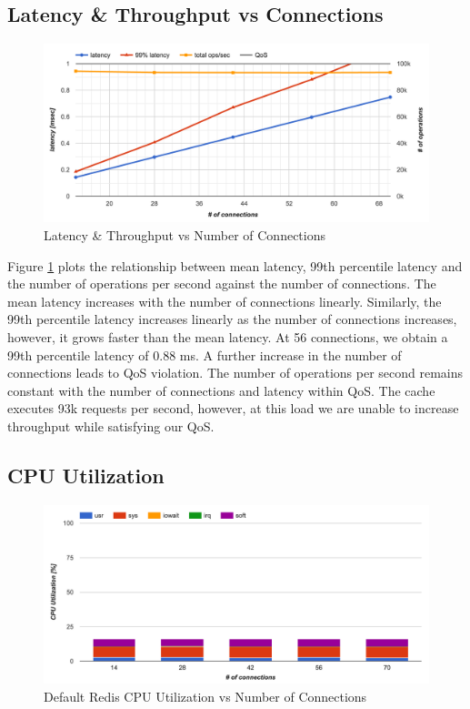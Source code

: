 \subsection{Latency \& Throughput vs Connections}
\begin{figure}[h]
    \includegraphics[width=\textwidth]{./res2/r_baseline_latency.png}
    \caption{Latency \& Throughput vs Number of Connections}
    \label{fig:r_baseline_latency}
\end{figure}

Figure \ref{fig:r_baseline_latency} plots the relationship between mean latency, 99th percentile latency and the number of operations per second against the number of connections.
The mean latency increases with the number of connections linearly. Similarly, the 99th percentile latency increases linearly as the number of connections increases, however, it grows faster than the mean latency. At 56 connections, we obtain a 99th percentile latency of 0.88 ms. A further increase in the number of connections leads to QoS violation.
The number of operations per second remains constant with the number of connections and latency within QoS. The cache executes 93k requests per second, however, at this load we are unable to increase throughput while satisfying our QoS.

\subsection{CPU Utilization}
\begin{figure}[h]
    \includegraphics[width=\textwidth]{./res2/r_baseline_cpu.png}
    \caption{Default Redis CPU Utilization vs Number of Connections}
    \label{fig:r_baseline_cpu}
\end{figure}

